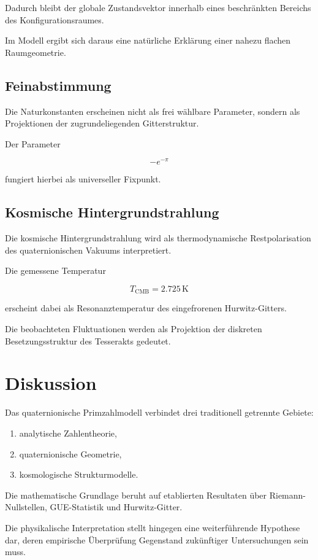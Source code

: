 \documentclass[11pt,a4paper]{article}
\begin{document}
Dadurch bleibt der globale Zustandsvektor innerhalb eines beschränkten Bereichs des Konfigurationsraumes.

Im Modell ergibt sich daraus eine natürliche Erklärung einer nahezu flachen Raumgeometrie.

\subsection{Feinabstimmung}

Die Naturkonstanten erscheinen nicht als frei wählbare Parameter, sondern als Projektionen der zugrundeliegenden Gitterstruktur.

Der Parameter

\[
-e^{-\pi}
\]

fungiert hierbei als universeller Fixpunkt.

\subsection{Kosmische Hintergrundstrahlung}

Die kosmische Hintergrundstrahlung wird als thermodynamische Restpolarisation des quaternionischen Vakuums interpretiert.

Die gemessene Temperatur

\[
T_{\mathrm{CMB}}=2.725\,\mathrm K
\]

erscheint dabei als Resonanztemperatur des eingefrorenen Hurwitz-Gitters.

Die beobachteten Fluktuationen werden als Projektion der diskreten Besetzungsstruktur des Tesserakts gedeutet.

\section{Diskussion}

Das quaternionische Primzahlmodell verbindet drei traditionell getrennte Gebiete:

\begin{enumerate}
\item analytische Zahlentheorie,
\item quaternionische Geometrie,
\item kosmologische Strukturmodelle.
\end{enumerate}

Die mathematische Grundlage beruht auf etablierten Resultaten über Riemann-Nullstellen, GUE-Statistik und Hurwitz-Gitter.

Die physikalische Interpretation stellt hingegen eine weiterführende Hypothese dar, deren empirische Überprüfung Gegenstand zukünftiger Untersuchungen sein muss.
\end{document}
